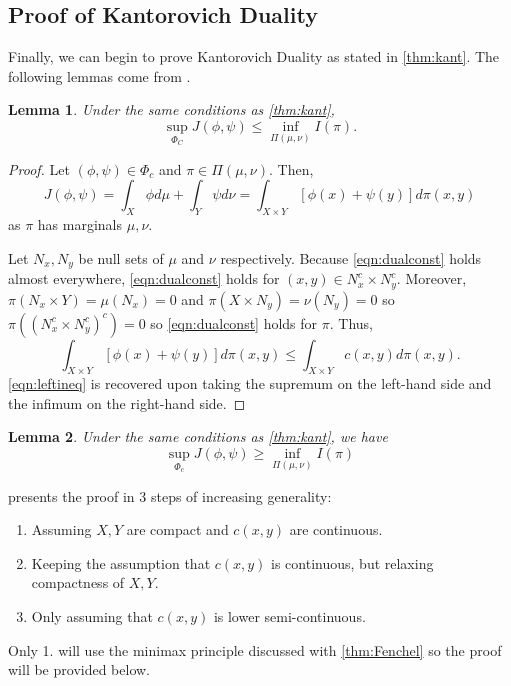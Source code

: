 \documentclass[12pt]{article}
\theoremstyle{plain}
\newtheorem{lem}{Lemma}[section]
\numberwithin{equation}{section}
\begin{document}
\subsection{Proof of Kantorovich Duality}
Finally, we can begin to prove Kantorovich Duality as stated in \autoref{thm:kant}. The following lemmas come from \cite{villani}.
\begin{lem}\label{lem:kant1}
  Under the same conditions as \autoref{thm:kant}, 
  \begin{equation}\label{eqn:leftineq}\sup_{\Phi_C} J(\phi,\psi) \le \inf_{\Pi(\mu,\nu)} I(\pi).\end{equation}
\end{lem}
\begin{proof}
  Let $(\phi,\psi) \in \Phi_c$ and $\pi\in \Pi(\mu,\nu)$. Then,
  \[J(\phi,\psi) = \int_X\phi d\mu + \int_Y\psi d\nu = \int_{X\times Y}[\phi(x)+\psi(y)]d\pi(x,y)\]
  as $\pi$ has marginals $\mu,\nu$.

  Let $N_x,N_y$ be null sets of $\mu$ and $\nu$ respectively. Because \autoref{eqn:dualconst} holds almost everywhere, \autoref{eqn:dualconst} holds for 
  $(x,y)\in N_x^c \times N_y^c$. Moreover, $\pi(N_x\times Y) = \mu(N_x) = 0$ and $\pi(X\times N_y) = \nu(N_y) = 0$ so $\pi((N_x^c\times N_y^c)^c) = 0$ so \autoref{eqn:dualconst} holds for $\pi$. Thus,
  \begin{equation}
    \int_{X\times Y}[\phi(x)+\psi(y)]d\pi(x,y) \le \int_{X\times Y}c(x,y)d\pi(x,y).
  \end{equation}
  \autoref{eqn:leftineq} is recovered upon taking the supremum on the left-hand side and the infimum on the right-hand side.
\end{proof}
\begin{lem}\label{lem:kant2}
  Under the same conditions as \autoref{thm:kant}, we have 
  \[\sup_{\Phi_c} J(\phi,\psi) \ge \inf_{\Pi(\mu,\nu)} I(\pi)\]
\end{lem}
\cite{villani} presents the proof in 3 steps of increasing generality:
  \begin{enumerate}[1.]
    \item Assuming $X,Y$ are compact and $c(x,y)$ are continuous.
    \item Keeping the assumption that $c(x,y)$ is continuous, but relaxing compactness of $X,Y$.
    \item Only assuming that $c(x,y)$ is lower semi-continuous.
  \end{enumerate}
  Only 1. will use the minimax principle discussed with \autoref{thm:Fenchel} so the proof will be provided below.
\end{document}
